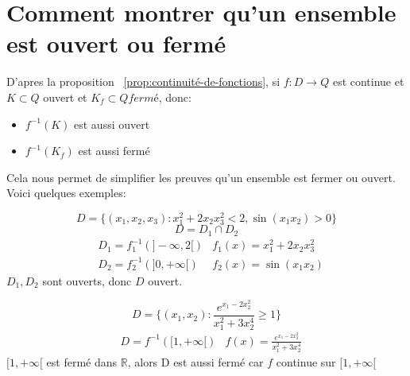 \documentclass[a4paper]{report}
\newcommand\R{\ensuremath{\mathbb{R}}}
\theoremstyle{definition}
\begin{document}
\section{Comment montrer qu'un ensemble est ouvert ou fermé}
D'apres la proposition ~\ref{prop:continuité-de-fonctions}, si $f: D \to Q$ est continue et $K \subset Q$ ouvert et $K_f \subset Q fermé$, donc:
\begin{itemize}
    \item $f^{-1}(K)$ est aussi ouvert
    \item $f^{-1}(K_f)$ est aussi fermé
\end{itemize}
Cela nous permet de simplifier les preuves qu'un ensemble est fermer ou ouvert. Voici quelques exemples:
\begin{eg}
   \[
       D = \{(x_1, x_2, x_3): x_1^2 + 2x_2x_3^2 < 2, \sin(x_1x_2) > 0\}
   \]  
   \[
   D = D_1 \cap D_2
   \] 
   \begin{align*}
       &D_1 = f_1^{-1}(]-\infty, 2[) &f_1(x) = x_1^2 + 2x_2x_3^2\\
       &D_2 = f_2^{-1}(]0, +\infty[) &f_2(x) = \sin(x_1x_2)
   \end{align*}
   $D_1, D_2$ sont ouverts, donc $D$ ouvert.
\end{eg}
\begin{eg}
   \[
       D = \{(x_1, x_2): \frac{e^{x_1 - 2x_2^2}}{x_1^2 + 3x_2^4} \ge 1 \}
   \]  
   \begin{align*}
       &D = f^{-1}([1, +\infty[) &f(x) = \frac{e^{x_1 - 2x_2^2}}{x_1^2 + 3x_2^4}
   \end{align*}
   $[1, +\infty[$ est fermé dans $\R$, alors D est aussi fermé car $f$ continue sur  $[1, +\infty[$
\end{eg}
\end{document}
